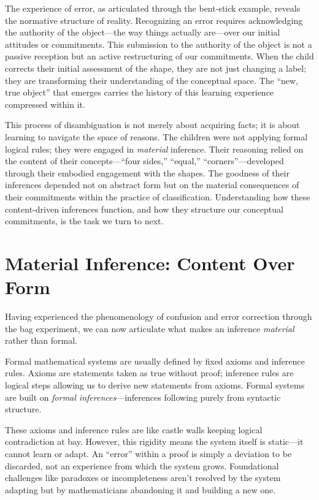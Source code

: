 \documentclass[12pt]{book}
\begin{document}
The experience of error, as articulated through the bent-stick example, reveals the normative structure of reality. Recognizing an error requires acknowledging the authority of the object---the way things actually are---over our initial attitudes or commitments. This submission to the authority of the object is not a passive reception but an active restructuring of our commitments. When the child corrects their initial assessment of the shape, they are not just changing a label; they are transforming their understanding of the conceptual space. The ``new, true object'' that emerges carries the history of this learning experience compressed within it.

This process of disambiguation is not merely about acquiring facts; it is about learning to navigate the space of reasons. The children were not applying formal logical rules; they were engaged in \emph{material} inference. Their reasoning relied on the content of their concepts---``four sides,'' ``equal,'' ``corners''---developed through their embodied engagement with the shapes. The goodness of their inferences depended not on abstract form but on the material consequences of their commitments within the practice of classification. Understanding how these content-driven inferences function, and how they structure our conceptual commitments, is the task we turn to next.

\section{Material Inference: Content Over Form}\label{material-inference-content-over-form}

Having experienced the phenomenology of confusion and error correction through the bag experiment, we can now articulate what makes an inference \emph{material} rather than formal.

Formal mathematical systems are usually defined by fixed axioms and inference rules. Axioms are statements taken as true without proof; inference rules are logical steps allowing us to derive new statements from axioms. Formal systems are built on \emph{formal inferences}---inferences following purely from syntactic structure.

These axioms and inference rules are like castle walls keeping logical contradiction at bay. However, this rigidity means the system itself is static---it cannot learn or adapt. An ``error'' within a proof is simply a deviation to be discarded, not an experience from which the system grows. Foundational challenges like paradoxes or incompleteness aren't resolved by the system adapting but by mathematicians abandoning it and building a new one.
\end{document}
